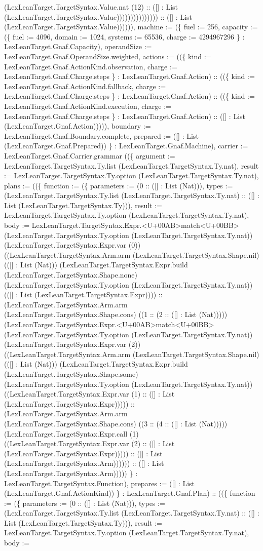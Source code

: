\documentclass[11pt]{article}
\begin{document}
(LexLeanTarget.TargetSyntax.Value.nat (12) :: ([] : List (LexLeanTarget.TargetSyntax.Value))))))))))))))) :: ([] : List (LexLeanTarget.TargetSyntax.Value)))))), machine := (\{ fuel := 256, capacity := (\{ fuel := 4096, domain := 1024, systems := 65536, charge := 4294967296 \} : LexLeanTarget.Gnaf.Capacity), operandSize := LexLeanTarget.Gnaf.OperandSize.weighted, actions := ((\{ kind := LexLeanTarget.Gnaf.ActionKind.observation, charge := LexLeanTarget.Gnaf.Charge.steps \} : LexLeanTarget.Gnaf.Action) :: ((\{ kind := LexLeanTarget.Gnaf.ActionKind.fallback, charge := LexLeanTarget.Gnaf.Charge.steps \} : LexLeanTarget.Gnaf.Action) :: ((\{ kind := LexLeanTarget.Gnaf.ActionKind.execution, charge := LexLeanTarget.Gnaf.Charge.steps \} : LexLeanTarget.Gnaf.Action) :: ([] : List (LexLeanTarget.Gnaf.Action))))), boundary := LexLeanTarget.Gnaf.Boundary.complete, prepared := ([] : List (LexLeanTarget.Gnaf.Prepared)) \} : LexLeanTarget.Gnaf.Machine), carrier := LexLeanTarget.Gnaf.Carrier.grammar ((\{ argument := LexLeanTarget.TargetSyntax.Ty.list (LexLeanTarget.TargetSyntax.Ty.nat), result := LexLeanTarget.TargetSyntax.Ty.option (LexLeanTarget.TargetSyntax.Ty.nat), plans := ((\{ function := (\{ parameters := (0 :: ([] : List (Nat))), types := (LexLeanTarget.TargetSyntax.Ty.list (LexLeanTarget.TargetSyntax.Ty.nat) :: ([] : List (LexLeanTarget.TargetSyntax.Ty))), result := LexLeanTarget.TargetSyntax.Ty.option (LexLeanTarget.TargetSyntax.Ty.nat), body := LexLeanTarget.TargetSyntax.Expr.<U+00AB>match<U+00BB> (LexLeanTarget.TargetSyntax.Ty.option (LexLeanTarget.TargetSyntax.Ty.nat)) (LexLeanTarget.TargetSyntax.Expr.var (0)) ((LexLeanTarget.TargetSyntax.Arm.arm (LexLeanTarget.TargetSyntax.Shape.nil) (([] : List (Nat))) (LexLeanTarget.TargetSyntax.Expr.build (LexLeanTarget.TargetSyntax.Shape.none) (LexLeanTarget.TargetSyntax.Ty.option (LexLeanTarget.TargetSyntax.Ty.nat)) (([] : List (LexLeanTarget.TargetSyntax.Expr)))) :: (LexLeanTarget.TargetSyntax.Arm.arm (LexLeanTarget.TargetSyntax.Shape.cons) ((1 :: (2 :: ([] : List (Nat))))) (LexLeanTarget.TargetSyntax.Expr.<U+00AB>match<U+00BB> (LexLeanTarget.TargetSyntax.Ty.option (LexLeanTarget.TargetSyntax.Ty.nat)) (LexLeanTarget.TargetSyntax.Expr.var (2)) ((LexLeanTarget.TargetSyntax.Arm.arm (LexLeanTarget.TargetSyntax.Shape.nil) (([] : List (Nat))) (LexLeanTarget.TargetSyntax.Expr.build (LexLeanTarget.TargetSyntax.Shape.some) (LexLeanTarget.TargetSyntax.Ty.option (LexLeanTarget.TargetSyntax.Ty.nat)) ((LexLeanTarget.TargetSyntax.Expr.var (1) :: ([] : List (LexLeanTarget.TargetSyntax.Expr))))) :: (LexLeanTarget.TargetSyntax.Arm.arm (LexLeanTarget.TargetSyntax.Shape.cons) ((3 :: (4 :: ([] : List (Nat))))) (LexLeanTarget.TargetSyntax.Expr.call (1) ((LexLeanTarget.TargetSyntax.Expr.var (2) :: ([] : List (LexLeanTarget.TargetSyntax.Expr))))) :: ([] : List (LexLeanTarget.TargetSyntax.Arm)))))) :: ([] : List (LexLeanTarget.TargetSyntax.Arm))))) \} : LexLeanTarget.TargetSyntax.Function), prepares := ([] : List (LexLeanTarget.Gnaf.ActionKind)) \} : LexLeanTarget.Gnaf.Plan) :: ((\{ function := (\{ parameters := (0 :: ([] : List (Nat))), types := (LexLeanTarget.TargetSyntax.Ty.list (LexLeanTarget.TargetSyntax.Ty.nat) :: ([] : List (LexLeanTarget.TargetSyntax.Ty))), result := LexLeanTarget.TargetSyntax.Ty.option (LexLeanTarget.TargetSyntax.Ty.nat), body := 
\end{document}
